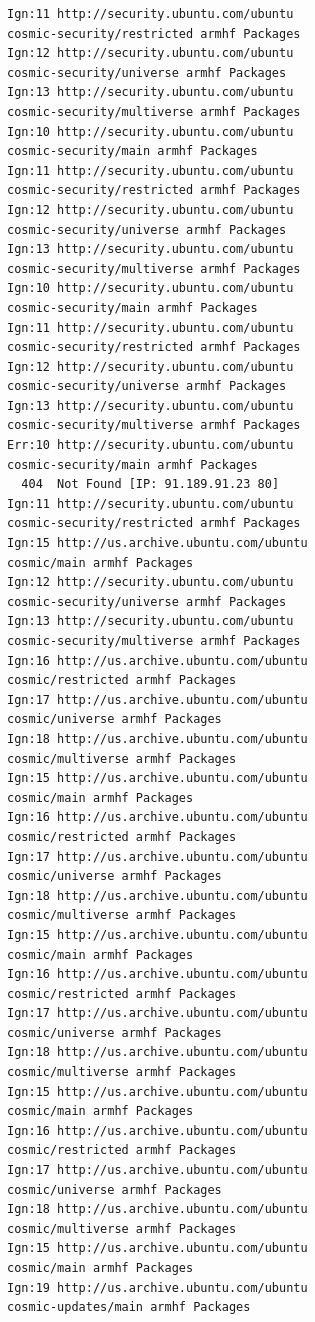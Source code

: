 \begin{verbatim}
Ign:11 http://security.ubuntu.com/ubuntu 
cosmic-security/restricted armhf Packages
Ign:12 http://security.ubuntu.com/ubuntu 
cosmic-security/universe armhf Packages
Ign:13 http://security.ubuntu.com/ubuntu 
cosmic-security/multiverse armhf Packages
Ign:10 http://security.ubuntu.com/ubuntu 
cosmic-security/main armhf Packages
Ign:11 http://security.ubuntu.com/ubuntu 
cosmic-security/restricted armhf Packages
Ign:12 http://security.ubuntu.com/ubuntu 
cosmic-security/universe armhf Packages
Ign:13 http://security.ubuntu.com/ubuntu 
cosmic-security/multiverse armhf Packages
Ign:10 http://security.ubuntu.com/ubuntu 
cosmic-security/main armhf Packages
Ign:11 http://security.ubuntu.com/ubuntu 
cosmic-security/restricted armhf Packages
Ign:12 http://security.ubuntu.com/ubuntu 
cosmic-security/universe armhf Packages
Ign:13 http://security.ubuntu.com/ubuntu 
cosmic-security/multiverse armhf Packages
Err:10 http://security.ubuntu.com/ubuntu 
cosmic-security/main armhf Packages
  404  Not Found [IP: 91.189.91.23 80]
Ign:11 http://security.ubuntu.com/ubuntu 
cosmic-security/restricted armhf Packages
Ign:15 http://us.archive.ubuntu.com/ubuntu 
cosmic/main armhf Packages
Ign:12 http://security.ubuntu.com/ubuntu 
cosmic-security/universe armhf Packages
Ign:13 http://security.ubuntu.com/ubuntu 
cosmic-security/multiverse armhf Packages
Ign:16 http://us.archive.ubuntu.com/ubuntu 
cosmic/restricted armhf Packages
Ign:17 http://us.archive.ubuntu.com/ubuntu 
cosmic/universe armhf Packages
Ign:18 http://us.archive.ubuntu.com/ubuntu 
cosmic/multiverse armhf Packages
Ign:15 http://us.archive.ubuntu.com/ubuntu 
cosmic/main armhf Packages
Ign:16 http://us.archive.ubuntu.com/ubuntu 
cosmic/restricted armhf Packages
Ign:17 http://us.archive.ubuntu.com/ubuntu 
cosmic/universe armhf Packages
Ign:18 http://us.archive.ubuntu.com/ubuntu 
cosmic/multiverse armhf Packages
Ign:15 http://us.archive.ubuntu.com/ubuntu 
cosmic/main armhf Packages
Ign:16 http://us.archive.ubuntu.com/ubuntu 
cosmic/restricted armhf Packages
Ign:17 http://us.archive.ubuntu.com/ubuntu 
cosmic/universe armhf Packages
Ign:18 http://us.archive.ubuntu.com/ubuntu 
cosmic/multiverse armhf Packages
Ign:15 http://us.archive.ubuntu.com/ubuntu 
cosmic/main armhf Packages
Ign:16 http://us.archive.ubuntu.com/ubuntu 
cosmic/restricted armhf Packages
Ign:17 http://us.archive.ubuntu.com/ubuntu 
cosmic/universe armhf Packages
Ign:18 http://us.archive.ubuntu.com/ubuntu 
cosmic/multiverse armhf Packages
Ign:15 http://us.archive.ubuntu.com/ubuntu 
cosmic/main armhf Packages
Ign:19 http://us.archive.ubuntu.com/ubuntu 
cosmic-updates/main armhf Packages

\end{verbatim}
